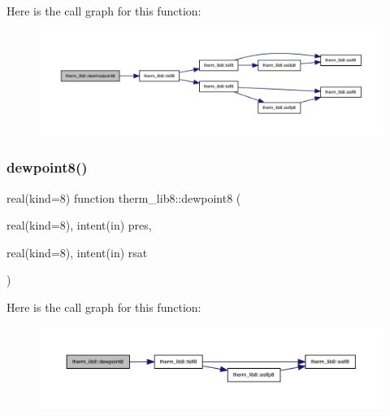 Here is the call graph for this function\+:
\nopagebreak
\begin{figure}[H]
\begin{center}
\leavevmode
\includegraphics[width=350pt]{namespacetherm__lib8_a028fa9eb09650fbaa2b7c0b6b8a2fd8c_cgraph}
\end{center}
\end{figure}
\mbox{\label{namespacetherm__lib8_a0d84f87a60357ce93e4c39dde6795068}} 
\subsubsection{\texorpdfstring{dewpoint8()}{dewpoint8()}}
{\footnotesize\ttfamily real(kind=8) function therm\+\_\+lib8\+::dewpoint8 (\begin{DoxyParamCaption}\item[{real(kind=8), intent(in)}]{pres,  }\item[{real(kind=8), intent(in)}]{rsat }\end{DoxyParamCaption})}

Here is the call graph for this function\+:
\nopagebreak
\begin{figure}[H]
\begin{center}
\leavevmode
\includegraphics[width=350pt]{namespacetherm__lib8_a0d84f87a60357ce93e4c39dde6795068_cgraph}
\end{center}
\end{figure}
\mbox{\label{namespacetherm__lib8_af3b110a715728849ed26074d4675f0e8}} 
